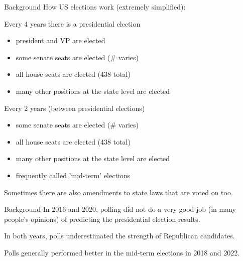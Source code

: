 \documentclass{beamer}
\begin{document}
\begin{frame}{Background}
How US elections work (extremely simplified): \vspace{4mm}

Every 4 years there is a presidential election
\begin{itemize}
    \item president and VP are elected
    \item some senate seats are elected (\# varies)
    \item all house seats are elected (438 total)
    \item many other positions at the state level are elected
\end{itemize} \vspace{4mm}

Every 2 years (between presidential elections)
\begin{itemize}
    \item some senate seats are elected (\# varies)
    \item all house seats are elected (438 total)
    \item many other positions at the state level are elected
    \item frequently called 'mid-term' elections
\end{itemize} \vspace{4mm}

Sometimes there are also amendments to state laws that are voted on too.


\end{frame}

\begin{frame}{Background}
In 2016 and 2020, polling did not do a very good job (in many people's opinions) of predicting the presidential election results. \vspace{10mm}

In both years, polls underestimated the strength of Republican candidates. \vspace{10mm}

Polls generally performed better in the mid-term elections in 2018 and 2022.
\end{frame}
\end{document}
